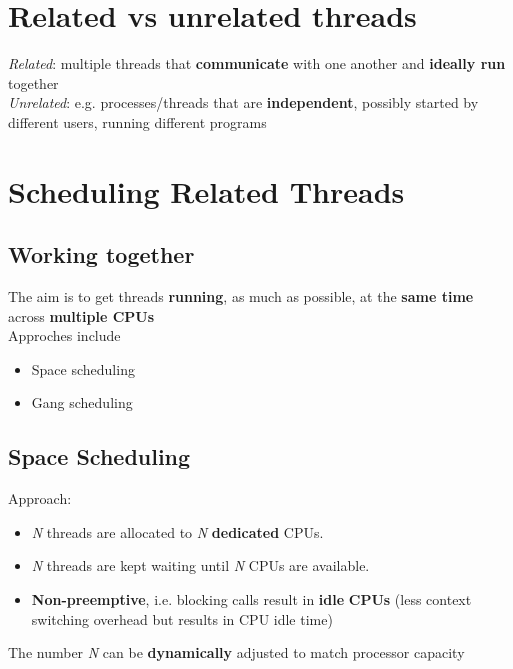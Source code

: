 \documentclass{article}
\begin{document}
\section{Related vs unrelated threads}
\begin{flushleft}
\textit{Related}: multiple threads that \textbf{communicate} with one another and \textbf{ideally run} together\\
\textit{Unrelated}: e.g. processes/threads that are \textbf{independent}, possibly started by different users, running different programs
\end{flushleft}

\section{Scheduling Related Threads}

\subsection{Working together}
\begin{flushleft}
The aim is to get threads \textbf{running}, as much as possible, at the \textbf{same time} across \textbf{multiple CPUs}\\
Approches include
\begin{itemize}
	\item Space scheduling
	\item Gang scheduling
\end{itemize}
\end{flushleft}

\subsection{Space Scheduling}
\begin{flushleft}
Approach:
\begin{itemize}
	\item \textit{N} threads are allocated to \textit{N} \textbf{dedicated} CPUs.
	\item \textit{N} threads are kept waiting until \textit{N} CPUs are available.
	\item \textbf{Non-preemptive}, i.e. blocking calls result in \textbf{idle} \textbf{CPUs} (less context switching overhead but results in CPU idle time)
\end{itemize}
The number \textit{N} can be \textbf{dynamically} adjusted to match processor capacity
\end{flushleft}
\end{document}
